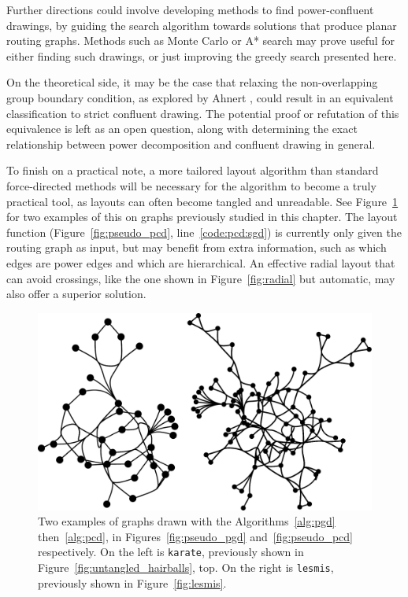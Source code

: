 Further directions could involve developing methods to find power-confluent drawings, by guiding the search algorithm towards solutions that produce planar routing graphs.
Methods such as Monte Carlo or A* search may prove useful for either finding such drawings, or just improving the greedy search presented here.

On the theoretical side, it may be the case that relaxing the non-overlapping group boundary condition, as explored by Ahnert \cite{Ahnert2014}, could result in an equivalent classification to strict confluent drawing.
The potential proof or refutation of this equivalence is left as an open question, along with determining the exact relationship between power decomposition and confluent drawing in general.

To finish on a practical note, a more tailored layout algorithm than standard force-directed methods will be necessary for the algorithm to become a truly practical tool, as layouts can often become tangled and unreadable. See Figure~\ref{fig:power_karate_lesmis} for two examples of this on graphs previously studied in this chapter.
The layout function (Figure~\ref{fig:pseudo_pcd}, line~\ref{code:pcd:sgd}) is currently only given the routing graph as input, but may benefit from extra information, such as which edges are power edges and which are hierarchical. An effective radial layout that can avoid crossings, like the one shown in Figure~\ref{fig:radial} but automatic, may also offer a superior solution.

\begin{figure}
  \centering
  \includegraphics[width=\linewidth]{power/power_karate_lesmis.pdf}
  \caption[Examples of networks drawn with the power-confluent algorithm]{Two examples of graphs drawn with the Algorithms~\ref{alg:pgd} then~\ref{alg:pcd}, in Figures~\ref{fig:pseudo_pgd} and~\ref{fig:pseudo_pcd} respectively. On the left is \texttt{karate}, previously shown in Figure~\ref{fig:untangled_hairballs}, top. On the right is \texttt{lesmis}, previously shown in Figure~\ref{fig:lesmis}.}
  \label{fig:power_karate_lesmis}
\end{figure}